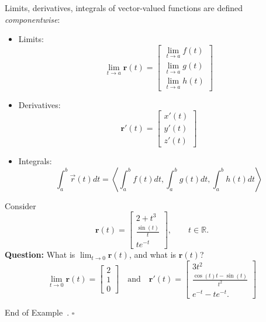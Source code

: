 \documentclass[10pt]{article}
\theoremstyle{definition}
\newtheorem{example}[theorem]{Example}
\renewenvironment{example}
{\begin{oldexample}}
  {\par\smallskip\hfill   End of Example~\theexample. $\square$    \par\end{oldexample}}
\newcommand{\1}[1]{\textbf{1}_{\left[#1\right]}} %
\def\R{\mathbb{R}} %
\begin{document}
Limits, derivatives, integrals of vector-valued functions are defined
\textit{componentwise}:

\begin{itemize}
  \item Limits:
  \begin{equation*}
    \lim_{t \to a} \boldsymbol{r}(t) =
    \begin{bmatrix}
      \lim_{t \to a} f(t)\\
      \lim_{t \to a} g(t)\\
      \lim_{t \to a} h(t)
    \end{bmatrix}
  \end{equation*}
  \item Derivatives:
  \begin{equation*}
    \boldsymbol{r}'(t) =
    \begin{bmatrix}
      x'(t)\\y'(t)\\z'(t)
    \end{bmatrix}
  \end{equation*}
  \item Integrals:
  \begin{equation*}
    \int_{a}^{b}\vec{r}(t)dt = \left\langle \int_{a}^{b}f(t)dt , \int_{a}^{b}g(t)dt, \int_{a}^{b}h(t)dt    \right\rangle  
  \end{equation*}
\end{itemize}



\begin{example}
  Consider
  \begin{equation*}
    \mathbf{r}(t) =
    \begin{bmatrix}
      2+t^{3}\\
      \frac{\sin(t)}{t}\\
      t e^{-t}
    \end{bmatrix}, \qquad t\in \R.
  \end{equation*}
  \textbf{Question:} What is $\lim_{t\to0} \boldsymbol{r}(t)$, and what is $\boldsymbol{r}(t)$?
  \begin{equation*}
    \lim_{t\to 0}\mathbf{r}(t)  =
    \begin{bmatrix}
      2\\1\\0
    \end{bmatrix}
    \quad \text{and} \quad
    \boldsymbol{r}'(t) =
    \begin{bmatrix}
      3t^{2}\\
      \frac{\cos(t)t-\sin(t)}{t^{2}}\\
      e^{-t}-te^{-t}.
    \end{bmatrix}
  \end{equation*}
\end{example}
\end{document}
